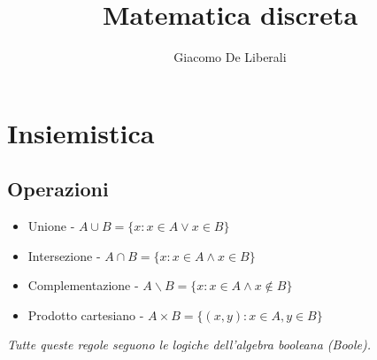 \documentclass[italian]{article}
\author{Giacomo De Liberali}
\begin{document}
	
\title{Matematica discreta}
\maketitle

\tableofcontents
\pagebreak
\section{Insiemistica}
\subsection{Operazioni}
\begin{itemize}
	\item Unione - $A\cup B=\{x:x\in A\lor x\in B\}$
	\item Intersezione - $A\cap B=\{x:x\in A\land x\in B\}$
	\item Complementazione - $A\backslash B=\{x:x\in A\land x\notin B\}$
	\item Prodotto cartesiano - $A\times B=\{(x,y):x\in A,y\in B\}$
\end{itemize}

\textit{Tutte queste regole seguono le logiche dell'algebra booleana (Boole).}\\
\end{document}

